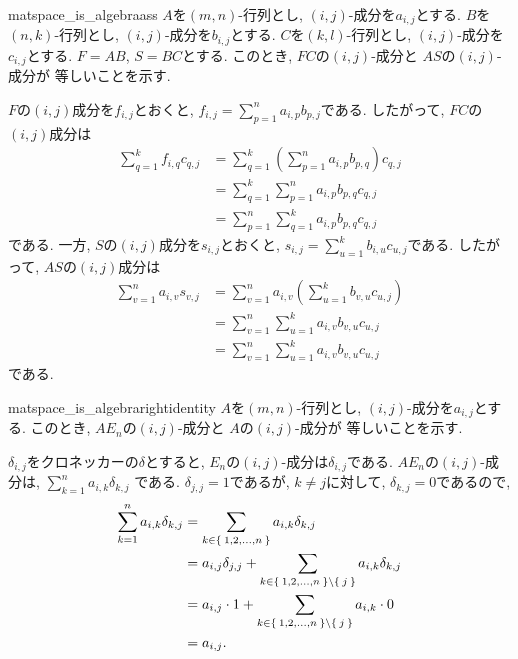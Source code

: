 \begin{proofof*}{matspace_is_algebra}{ass}
  $A$を$(m,n)$-行列とし, $(i,j)$-成分を$a_{i,j}$とする.
  $B$を$(n,k)$-行列とし, $(i,j)$-成分を$b_{i,j}$とする.
  $C$を$(k,l)$-行列とし, $(i,j)$-成分を$c_{i,j}$とする.
  $F=AB$, $S=BC$とする.
  このとき,
  $FC$の$(i,j)$-成分と
  $AS$の$(i,j)$-成分が
  等しいことを示す.

  $F$の$(i,j)$成分を$f_{i,j}$とおくと,
  $f_{i,j}=\sum_{p=1}^{n}a_{i,p}b_{p,j}$である.
  したがって, $FC$の$(i,j)$成分は
  \begin{align*}
    \sum_{q=1}^{k}f_{i,q}c_{q,j}
    &=\sum_{q=1}^{k}\left(\sum_{p=1}^{n}a_{i,p}b_{p,q}\right)c_{q,j}\\
    &=\sum_{q=1}^{k}\sum_{p=1}^{n}a_{i,p}b_{p,q}c_{q,j}\\
    &=\sum_{p=1}^{n}\sum_{q=1}^{k}a_{i,p}b_{p,q}c_{q,j}
  \end{align*}
  である.
  一方,
  $S$の$(i,j)$成分を$s_{i,j}$とおくと,
  $s_{i,j}=\sum_{u=1}^{k}b_{i,u}c_{u,j}$である.
  したがって, $AS$の$(i,j)$成分は
  \begin{align*}
    \sum_{v=1}^{n}a_{i,v}s_{v,j}
    &=\sum_{v=1}^{n}a_{i,v}\left(\sum_{u=1}^{k}b_{v,u}c_{u,j}\right)\\
    &=\sum_{v=1}^{n}\sum_{u=1}^{k}a_{i,v}b_{v,u}c_{u,j}\\
    &=\sum_{v=1}^{n}\sum_{u=1}^{k}a_{i,v}b_{v,u}c_{u,j}
  \end{align*}
  である.
\end{proofof*}

\begin{proofof*}{matspace_is_algebra}{rightidentity}
  $A$を$(m,n)$-行列とし, $(i,j)$-成分を$a_{i,j}$とする.
  このとき,
  $AE_n$の$(i,j)$-成分と
  $A$の$(i,j)$-成分が
  等しいことを示す.

  $\delta_{i,j}$をクロネッカーの$\delta$とすると,
  $E_n$の$(i,j)$-成分は$\delta_{i,j}$である.
  $AE_n$の$(i,j)$-成分は,
  $\sum_{k=1}^{n}a_{i,k}\delta_{k,j}$
  である.
  $\delta_{j,j}=1$であるが,
  $k\neq j$に対して, $\delta_{k,j}=0$であるので,
  \begin{align*}
    \sum_{k=1}^{n}a_{i,k}\delta_{k,j}
    &=\sum_{k\in \Set{1,2,\ldots,n}}a_{i,k}\delta_{k,j}\\
    &=a_{i,j}\delta_{j,j} + \sum_{k\in \Set{1,2,\ldots,n}\setminus\Set{j}}a_{i,k}\delta_{k,j}\\
    &=a_{i,j}\cdot 1 + \sum_{k\in \Set{1,2,\ldots,n}\setminus\Set{j}}a_{i,k}\cdot 0\\
    &=a_{i,j}.
  \end{align*}
  
\end{proofof*}

